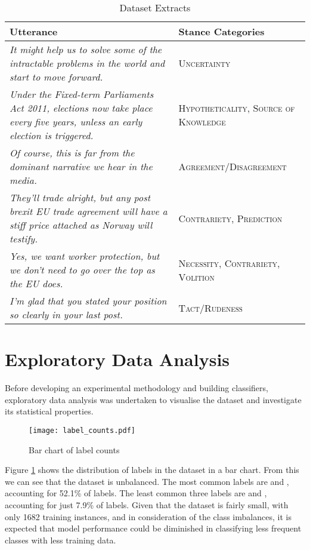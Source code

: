 \documentclass[Dissertation.tex]{subfiles}
\begin{document}
{\renewcommand{\arraystretch}{1.5}
	\centering
\begin{table}[]
	\caption{Dataset Extracts
	\label{tab:dataExtracts}}
	\begin{tabularx}{\textwidth}{>{\raggedright}X >{\raggedright \arraybackslash}p{5cm}}
		\toprule
		Utterance 											& Stance Categories \\ \midrule
		\itshape It might help us to solve some of the intractable problems in the world and start to move forward. &\small\scshape Uncertainty \\
		\itshape Under the Fixed-term Parliaments Act 2011, elections now take place every five years, unless an early election is triggered. &\small\scshape  Hypotheticality, Source of Knowledge \\
		\itshape Of course, this is far from the dominant narrative we hear in the media. & \small\scshape Agreement/Disagreement \\
		\itshape They’ll trade alright, but any post brexit EU trade agreement will have a stiff price attached as Norway will testify. &\small\scshape  Contrariety, Prediction\\
		\itshape Yes, we want worker protection, but we don’t need to go over the top as the EU does. & \small\scshape Necessity, Contrariety, Volition\\
		\itshape I’m glad that you stated your position so clearly in your last post. &\small\scshape  Tact/Rudeness
		 \\\bottomrule
		
	\end{tabularx}

\end{table}}

\section{Exploratory Data Analysis} \label{sec:EDA}
Before developing an experimental methodology and building classifiers, exploratory data analysis was undertaken to visualise the dataset and investigate its statistical properties.


\begin{figure}
	\centering
	\texttt{[image: label\_counts.pdf]}
	\caption{Bar chart of label counts}
	\label{fig:labelBarChart}
\end{figure}

Figure \ref{fig:labelBarChart} shows the distribution of labels in the dataset in a bar chart. From this we can see that the dataset is unbalanced. The most common labels are  and , accounting for 52.1\% of labels.  The least common three labels are  and , accounting for just 7.9\% of labels.  Given that the dataset is fairly small, with only 1682 training instances, and in consideration of the class imbalances, it is expected that model performance could be diminished in classifying less frequent classes with less training data.
\end{document}
